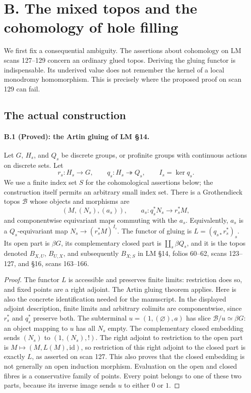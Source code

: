 \section{B. The mixed topos and the cohomology of hole filling}\label{part:B}

We first fix a consequential ambiguity. The assertions about cohomology on
LM scans 127--129 concern an ordinary glued topos. Deriving the gluing
functor is indispensable. Its underived value does not remember the kernel
of a local monodromy homomorphism. This is precisely where the proposed
proof on scan 129 can fail.

\subsection{The actual construction}

\paragraph{B.1 (Proved): the Artin gluing of LM \S14.}\label{B1}
Let $G$, $H_s$, and $Q_s$ be discrete groups, or profinite groups with
continuous actions on discrete sets. Let
\[
 r_s:H_s\longrightarrow G,\qquad q_s:H_s\twoheadrightarrow Q_s,
 \qquad I_s=\ker q_s.
\]
We use a finite index set $S$ for the cohomological assertions below;
the construction itself permits an arbitrary small index set. There is a
Grothendieck topos $\mathcal B$ whose objects and morphisms are
\[
 (M,(N_s), (a_s)),\qquad
 a_s:q_s^*N_s\longrightarrow r_s^*M,
\]
and componentwise equivariant maps commuting with the $a_s$.
Equivalently, $a_s$ is a $Q_s$-equivariant map
$N_s\to(r_s^*M)^{I_s}$. The functor of gluing is
$L=(q_{s*}r_s^*)_s$. Its open part is $\beta G$, its complementary
closed part is $\coprod_s\beta Q_s$, and it is the topos denoted
$B_{X,U}$, $B_{U,X}$, and subsequently $B_{X;S}$ in LM
\S14, folios 60--62, scans 123--127, and \S16, scans 163--166.

\begin{proof}
The functor $L$ is accessible and preserves finite limits: restriction
does so, and fixed points are a right adjoint. The Artin gluing theorem
\citep[IV, Th\'eor\`eme 9.5.4]{SGA4} applies. Here is also the concrete
identification needed for the manuscript. In the displayed adjoint
description, finite limits and arbitrary colimits are componentwise,
since $r_s^*$ and $q_s^*$ preserve both. The subterminal
$u=(1,(\varnothing),a)$ has slice $\mathcal B/u\simeq\beta G$:
an object mapping to $u$ has all $N_s$ empty. The complementary closed
embedding sends $(N_s)$ to $(1,(N_s),!)$. The right adjoint to restriction
to the open part is $M\mapsto(M,L(M),\mathrm{id})$, so restriction of
this right adjoint to the closed part is exactly $L$, as asserted on
scan 127. This also proves that the closed embedding is not generally an
open induction morphism. Evaluation on the open and closed fibres is a
conservative family of points. Every point belongs to one of these two
parts, because its inverse image sends $u$ to either $0$ or $1$.
\end{proof}

